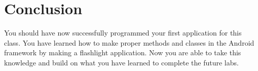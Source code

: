 \section{Conclusion}

You should have now successfully programmed your first application for this class. 
You have learned how to make proper methods and classes in the Android framework by making a flashlight application. 
Now you are able to take this knowledge and build on what you have learned to complete the future labs.
